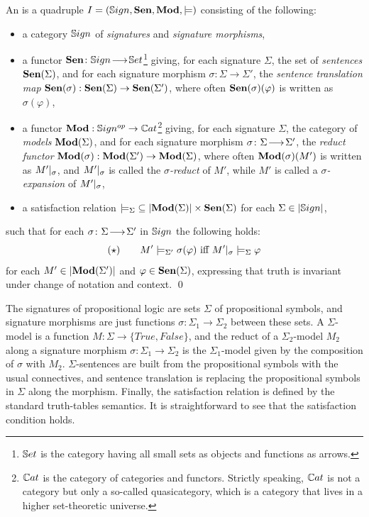 \documentclass[10pt,fleqn,%
\ifpretendfinal
final%
\else
draft%
\fi,
]{scrreprt}
\begin{document}
\begin{definition}\label{def:inst} An
 \cite{GoguenBurstall92} is a quadruple $I=(\mathbb{S}ign,\mathbf {Sen},\mathbf{Mod},{\models})$
consisting of the following:
%
\begin{itemize}
\item a category $\mathbb{S}ign$ of \emph{signatures} and \emph{signature morphisms},
\item a functor $\mathbf {Sen}\colon\mathbb{S}ign\!\longrightarrow\!\mathbb{S}et$\footnote{$\mathbb{S}et$ is the
category having all small \textsc{}sets as objects and functions as
arrows.}  giving, for each signature $\Sigma$, the set of
\emph{sentences} $\mathbf {Sen}(\Sigma)$, and for each signature morphism
$\sigma:{\Sigma}\to{\Sigma'}$, the \emph{sentence translation map}
$\mathbf {Sen}(\sigma):{\mathbf {Sen}(\Sigma)}\to{\mathbf {Sen}(\Sigma')}$, where often
$\mathbf {Sen}(\sigma)(\varphi)$ is written as $\sigma(\varphi)$, \item a
functor $\mathbf{Mod}:{\mathbb{S}ign^{op}}\to{\mathbb{C}at}$\footnote {$\mathbb{C}at$ is the category
of categories and functors. Strictly speaking, $\mathbb{C}at$ is not a
category but only a so-called quasicategory, which is a category that
lives in a higher set-theoretic universe.} giving, for each signature
$\Sigma$, the category of \emph{models} $\mathbf{Mod}(\Sigma)$, and for each
signature morphism $\sigma\colon\Sigma\!\longrightarrow\!\Sigma'$, the \emph{reduct
functor\/} $\mathbf{Mod}(\sigma):{\mathbf{Mod}(\Sigma')}\to {\mathbf{Mod}(\Sigma)}$, where
often $\mathbf{Mod}(\sigma)(M')$ is written as $M'|_{\sigma}$, and
$M'|_{\sigma}$ is called the \emph{$\sigma$-reduct} of $M'$,
while $M'$ is called a \emph{$\sigma$-expansion} of
$M'|_{\sigma}$,
\item a satisfaction relation
${\models_{\Sigma}}\subseteq|{\mathbf{Mod}(\Sigma)|\times\mathbf {Sen}(\Sigma)}$ for
each $\Sigma\in |\mathbb{S}ign|$,
\end{itemize}
%
such that for each $\sigma\colon\Sigma\!\longrightarrow\!\Sigma'$ in $\mathbb{S}ign$ the following  holds:
$$
(\star) \qquad M'\models_{\Sigma'}\sigma(\varphi) \mbox{ iff }
M'|_{\sigma} \models_{\Sigma} \varphi
$$
for each $M'\in |\mathbf{Mod}(\Sigma')|$ and $\varphi\in \mathbf {Sen}(\Sigma)$,
expressing that truth is invariant under change of notation and
context.  \qed
\end{definition}

\begin{definition}\label{Prop}
The signatures of propositional logic are sets $\Sigma$ of propositional symbols, and signature morphisms are just
functions $\sigma:{\Sigma_1}\to{\Sigma_2}$ between these sets. 
A $\Sigma$-model is a function $M : {\Sigma}\to{\{True, False\}}$, and the reduct of a 
$\Sigma_2$-model $M_2$ along a signature morphism $\sigma:{\Sigma_1}\to{\Sigma_2}$ is 
the $\Sigma_1$-model given by the composition of $\sigma$ with $M_2$. $\Sigma$-sentences are built from the
propositional symbols with the usual connectives, and sentence translation is replacing the propositional
symbols in $\Sigma$ along the morphism. Finally, the satisfaction relation is defined by the standard truth-tables
semantics. It is straightforward to see that the satisfaction condition holds.
\end{definition}
\end{document}
